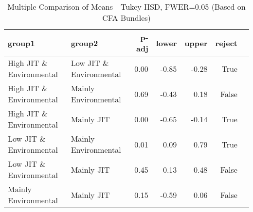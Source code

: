 \begin{table}[htbp]
\centering
\caption{Multiple Comparison of Means - Tukey HSD, FWER=0.05 (Based on CFA Bundles)}
\label{tab:your_label}
\begin{tabular}{llrrrrr}
\toprule
group1 & group2 & p-adj & lower & upper & reject \\
\midrule
High JIT \& Environmental & Low JIT \& Environmental & 0.00 & -0.85 & -0.28 & True \\
High JIT \& Environmental & Mainly Environmental & 0.69 & -0.43 & 0.18 & False \\
High JIT \& Environmental & Mainly JIT & 0.00 & -0.65 & -0.14 & True \\
Low JIT \& Environmental & Mainly Environmental & 0.01 & 0.09 & 0.79 & True \\
Low JIT \& Environmental & Mainly JIT & 0.45 & -0.13 & 0.48 & False \\
Mainly Environmental & Mainly JIT & 0.15 & -0.59 & 0.06 & False \\
\bottomrule
\end{tabular}\end{table}